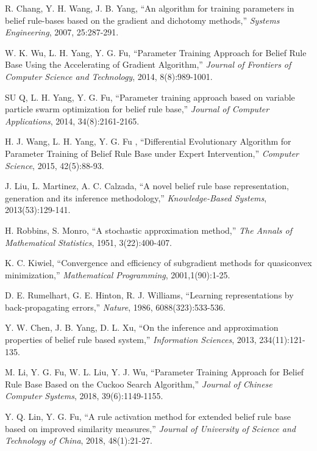 \documentclass{ieeeaccess}
\begin{document}
\begin{thebibliography}{00}
     R. Chang, Y. H. Wang, J. B. Yang, ``An algorithm for training parameters
    in belief rule-bases based on the gradient and dichotomy methods,''
    \emph{Systems Engineering},
    2007, 25:287-291.

     W. K. Wu, L. H. Yang, Y. G. Fu, ``Parameter Training Approach for Belief Rule Base Using the Accelerating of Gradient
    Algorithm,''
    \emph{Journal of Frontiers of Computer Science and Technology},
    2014, 8(8):989-1001.

     SU Q, L. H. Yang, Y. G. Fu, ``Parameter training approach based on variable particle swarm optimization
    for belief rule base,''
    \emph{Journal of Computer Applications},
    2014, 34(8):2161-2165.

     H. J. Wang, L. H. Yang, Y. G. Fu , ``Differential Evolutionary Algorithm for Parameter Training of Belief Rule Base under Expert Intervention,''
    \emph{Computer Science},
    2015, 42(5):88-93.

     J. Liu, L. Martinez, A. C. Calzada, ``A novel belief rule base representation, generation and its inference methodology,''
    \emph{Knowledge-Based Systems},
    2013(53):129-141.

     H. Robbins, S. Monro, ``A stochastic approximation method,''
    \emph{The Annals of Mathematical Statistics},
    1951, 3(22):400-407.

     K. C. Kiwiel, ``Convergence and efficiency of subgradient methods for quasiconvex minimization,''
    \emph{Mathematical Programming},
    2001,1(90):1-25.

     D. E. Rumelhart, G. E. Hinton, R. J. Williams, ``Learning representations
    by back-propagating errors,''
    \emph{Nature},
    1986, 6088(323):533-536.

     Y. W. Chen, J. B. Yang, D. L. Xu, ``On the inference and approximation properties of belief rule based system,''
    \emph{Information Sciences}, 2013, 234(11):121-135.

     M. Li, Y. G. Fu, W. L. Liu, Y. J. Wu, ``Parameter Training  Approach for Belief Rule Base Based on the Cuckoo Search Algorithm,''
    \emph{Journal of Chinese Computer Systems}, 2018, 39(6):1149-1155.

     Y. Q. Lin, Y. G. Fu, ``A rule activation method for extended belief rule base based on improved similarity measures,''
    \emph{Journal of University of Science and Technology of China},
    2018, 48(1):21-27.


\end{thebibliography}
\end{document}

